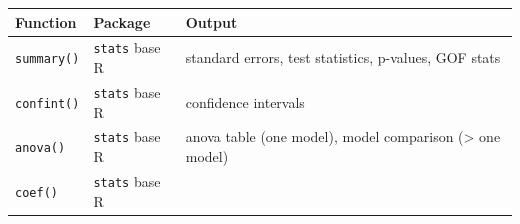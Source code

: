\documentclass[]{book}
\begin{document}
\begin{longtable}[]{@{}lll@{}}
\toprule
\begin{minipage}[b]{0.16\columnwidth}\raggedright
Function\strut
\end{minipage} & \begin{minipage}[b]{0.17\columnwidth}\raggedright
Package\strut
\end{minipage} & \begin{minipage}[b]{0.59\columnwidth}\raggedright
Output\strut
\end{minipage}\tabularnewline
\midrule
\endhead
\begin{minipage}[t]{0.16\columnwidth}\raggedright
\texttt{summary()}\strut
\end{minipage} & \begin{minipage}[t]{0.17\columnwidth}\raggedright
\texttt{stats} base R\strut
\end{minipage} & \begin{minipage}[t]{0.59\columnwidth}\raggedright
standard errors, test statistics, p-values, GOF stats\strut
\end{minipage}\tabularnewline
\begin{minipage}[t]{0.16\columnwidth}\raggedright
\texttt{confint()}\strut
\end{minipage} & \begin{minipage}[t]{0.17\columnwidth}\raggedright
\texttt{stats} base R\strut
\end{minipage} & \begin{minipage}[t]{0.59\columnwidth}\raggedright
confidence intervals\strut
\end{minipage}\tabularnewline
\begin{minipage}[t]{0.16\columnwidth}\raggedright
\texttt{anova()}\strut
\end{minipage} & \begin{minipage}[t]{0.17\columnwidth}\raggedright
\texttt{stats} base R\strut
\end{minipage} & \begin{minipage}[t]{0.59\columnwidth}\raggedright
anova table (one model), model comparison (\textgreater{} one model)\strut
\end{minipage}\tabularnewline
\begin{minipage}[t]{0.16\columnwidth}\raggedright
\texttt{coef()}\strut
\end{minipage} & \begin{minipage}[t]{0.17\columnwidth}\raggedright
\texttt{stats} base R\strut
\end{minipage} & \begin{minipage}[t]{0.59\columnwidth}\raggedright

\end{minipage}
\end{longtable}
\end{document}
